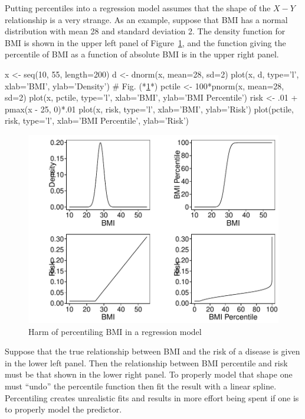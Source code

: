Putting percentiles into a regression model assumes that the shape of
the $X-Y$ relationship is a very strange.  As an example, suppose that
BMI has a normal distribution with mean 28 and standard deviation 2.
The density function for BMI is shown in the upper left panel of
Figure~\ref{fig:reg-bmi}, and the function giving the percentile of
BMI as a function of absolute BMI is in the upper right panel.
\begin{Schunk}
\begin{Sinput}
x <- seq(10, 55, length=200)
d <- dnorm(x, mean=28, sd=2)
plot(x, d, type='l', xlab='BMI', ylab='Density')   # Fig. (*\ref{fig:reg-bmi}*)
pctile <- 100*pnorm(x, mean=28, sd=2)
plot(x, pctile, type='l', xlab='BMI', ylab='BMI Percentile')
risk <- .01 + pmax(x - 25, 0)*.01
plot(x, risk, type='l', xlab='BMI', ylab='Risk')
plot(pctile, risk, type='l', xlab='BMI Percentile', ylab='Risk')
\end{Sinput}
\begin{figure}[htbp]

\centerline{\includegraphics[width=\maxwidth]{reg-bmi-1} }

\caption[Harm of percentiling BMI in a regression model]{Harm of percentiling BMI in a regression model}\label{fig:reg-bmi}
\end{figure}
\end{Schunk}
Suppose that the true relationship between BMI and the risk of a
disease is given in the lower left panel.  Then the relationship
between BMI percentile and risk must be that shown in the lower right
panel.  To properly model that shape one must ``undo'' the percentile
function then fit the result with a linear spline.  Percentiling
creates unrealistic fits and results in more effort being spent if one
is to properly model the predictor.

